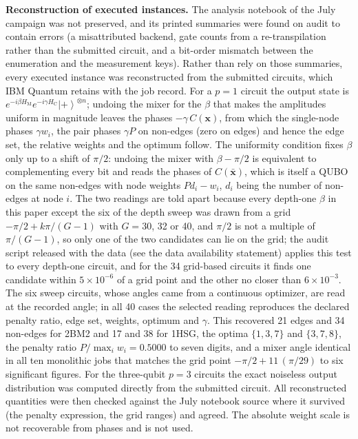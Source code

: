 \documentclass{iopjournal}
\newcommand{\ket}[1]{\left|#1\right\rangle}
\newcommand{\Hc}{H_{\mathrm{C}}}
\newcommand{\Hm}{H_{\mathrm{M}}}
\begin{document}
\textbf{Reconstruction of executed instances.} The analysis notebook of the July campaign was not preserved, and its printed summaries were found on audit to contain errors (a misattributed backend, gate counts from a re-transpilation rather than the submitted circuit, and a bit-order mismatch between the enumeration and the measurement keys). Rather than rely on those summaries, every executed instance was reconstructed from the submitted circuits, which IBM Quantum retains with the job record. For a $p=1$ circuit the output state is $e^{-i\beta\Hm} e^{-i\gamma\Hc}\ket{+}^{\otimes n}$; undoing the mixer for the $\beta$ that makes the amplitudes uniform in magnitude leaves the phases $-\gamma\,C(\mathbf{x})$, from which the single-node phases $\gamma w_i$, the pair phases $\gamma P$ on non-edges (zero on edges) and hence the edge set, the relative weights and the optimum follow. The uniformity condition fixes $\beta$ only up to a shift of $\pi/2$: undoing the mixer with $\beta - \pi/2$ is equivalent to complementing every bit and reads the phases of $C(\bar{\mathbf{x}})$, which is itself a QUBO on the same non-edges with node weights $P d_i - w_i$, $d_i$ being the number of non-edges at node $i$. The two readings are told apart because every depth-one $\beta$ in this paper except the six of the depth sweep was drawn from a grid $-\pi/2 + k\pi/(G-1)$ with $G = 30$, 32 or 40, and $\pi/2$ is not a multiple of $\pi/(G-1)$, so only one of the two candidates can lie on the grid; the audit script released with the data (see the data availability statement) applies this test to every depth-one circuit, and for the 34 grid-based circuits it finds one candidate within $5\times10^{-6}$ of a grid point and the other no closer than $6\times10^{-3}$. The six sweep circuits, whose angles came from a continuous optimizer, are read at the recorded angle; in all 40 cases the selected reading reproduces the declared penalty ratio, edge set, weights, optimum and $\gamma$. This recovered 21 edges and 34 non-edges for 2BM2 and 17 and 38 for 1HSG, the optima $\{1,3,7\}$ and $\{3,7,8\}$, the penalty ratio $P/\max_i w_i = 0.5000$ to seven digits, and a mixer angle identical in all ten monolithic jobs that matches the grid point $-\pi/2 + 11\,(\pi/29)$ to six significant figures. For the three-qubit $p=3$ circuits the exact noiseless output distribution was computed directly from the submitted circuit. All reconstructed quantities were then checked against the July notebook source where it survived (the penalty expression, the grid ranges) and agreed. The absolute weight scale is not recoverable from phases and is not used.
\end{document}

